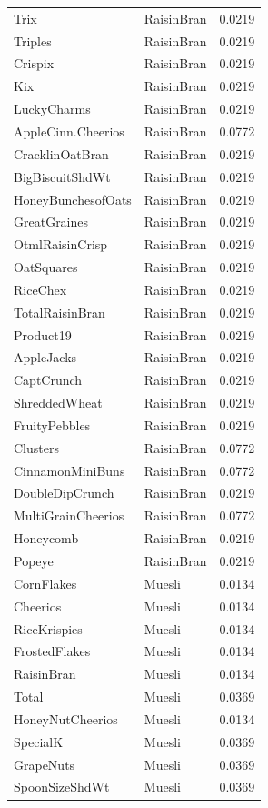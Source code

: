 \begin{longtable}{llr}
Trix & RaisinBran & 0.0219 \\
Triples & RaisinBran & 0.0219 \\
Crispix & RaisinBran & 0.0219 \\
Kix & RaisinBran & 0.0219 \\
LuckyCharms & RaisinBran & 0.0219 \\
AppleCinn.Cheerios & RaisinBran & 0.0772 \\
CracklinOatBran & RaisinBran & 0.0219 \\
BigBiscuitShdWt & RaisinBran & 0.0219 \\
HoneyBunchesofOats & RaisinBran & 0.0219 \\
GreatGraines & RaisinBran & 0.0219 \\
OtmlRaisinCrisp & RaisinBran & 0.0219 \\
OatSquares & RaisinBran & 0.0219 \\
RiceChex & RaisinBran & 0.0219 \\
TotalRaisinBran & RaisinBran & 0.0219 \\
Product19 & RaisinBran & 0.0219 \\
AppleJacks & RaisinBran & 0.0219 \\
CaptCrunch & RaisinBran & 0.0219 \\
ShreddedWheat & RaisinBran & 0.0219 \\
FruityPebbles & RaisinBran & 0.0219 \\
Clusters & RaisinBran & 0.0772 \\
CinnamonMiniBuns & RaisinBran & 0.0772 \\
DoubleDipCrunch & RaisinBran & 0.0219 \\
MultiGrainCheerios & RaisinBran & 0.0772 \\
Honeycomb & RaisinBran & 0.0219 \\
Popeye & RaisinBran & 0.0219 \\
CornFlakes & Muesli & 0.0134 \\
Cheerios & Muesli & 0.0134 \\
RiceKrispies & Muesli & 0.0134 \\
FrostedFlakes & Muesli & 0.0134 \\
RaisinBran & Muesli & 0.0134 \\
Total & Muesli & 0.0369 \\
HoneyNutCheerios & Muesli & 0.0134 \\
SpecialK & Muesli & 0.0369 \\
GrapeNuts & Muesli & 0.0369 \\
SpoonSizeShdWt & Muesli & 0.0369 \\

\end{longtable}
